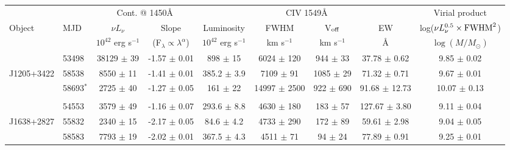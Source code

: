 \begin{table*}
  \small
  \begin{centering}
    \begin{tabular}{l  l | c c | c c c c | c}
      \hline
      \hline
              &          &  \multicolumn{2}{c}{Cont. @ 1450\AA }                  &   \multicolumn{4}{c}{CIV 1549\AA}                                                                                & Virial product \\
Object    & MJD  &      $\nu L_{\nu}$    &         Slope                             &   Luminosity         &     FWHM                 &    V$_{\rm off}$    & EW                                 & log($\nu L_{\nu}^{0.5} \times {\rm FWHM}^2$) \\
 & & $10^{42}$ erg s$^{-1}$ & (F$_\lambda \propto \lambda^\alpha$)  & $10^{42}$ erg s$^{-1}$ &  km s$^{-1}$   &     km s$^{-1}$   &  \AA                              &  $\log(M/M_{\odot})$ \\
      \hline
                     & 53498   &  38129  $\pm$ 39  &  -1.57 $\pm$ 0.01 &   898 $\pm$ 15    &   6024 $\pm$  120  &  944 $\pm$  33  & 37.78 $\pm$  0.62  &   9.85 $\pm$ 0.02\\
 J1205+3422 & 58538    &  8550 $\pm$ 11    &  -1.41 $\pm$ 0.01 &  385.2 $\pm$ 3.9 &   7109 $\pm$   91   & 1085 $\pm$  29  &   71.32 $\pm$  0.71  &   9.67 $\pm$ 0.01\\  
                     & 58693$^*$ & 2725 $\pm$ 40 &  -1.27 $\pm$ 0.05 &  161 $\pm$ 22    &  14997 $\pm$ 2500 &  922 $\pm$ 690  & 91.68 $\pm$ 12.73  &  10.07 $\pm$ 0.13\\  
                      &              &                               &                               &                              &                                 &                             &                                   &                              \\
                      & 54553   & 3579 $\pm$ 49    &  -1.16 $\pm$ 0.07  & 293.6  $\pm$ 8.8 &  4630 $\pm$  180   & 183 $\pm$  57   & 127.67 $\pm$  3.80  &    9.11 $\pm$ 0.04\\  
 J1638+2827 & 55832   & 2340 $\pm$ 15    &  -2.17 $\pm$ 0.05  &  84.6  $\pm$ 4.2  &  4733 $\pm$  290   & 172 $\pm$  89   &  59.61 $\pm$  2.98  &    9.04 $\pm$ 0.05\\  
                      & 58583  & 7793 $\pm$ 19     &  -2.02 $\pm$ 0.01  & 367.5  $\pm$ 4.3 &  4511 $\pm$   71    &  94 $\pm$  24   &  77.89 $\pm$  0.91  &  9.25 $\pm$ 0.01\\  

\end{tabular}
\end{centering}
\end{table*}
